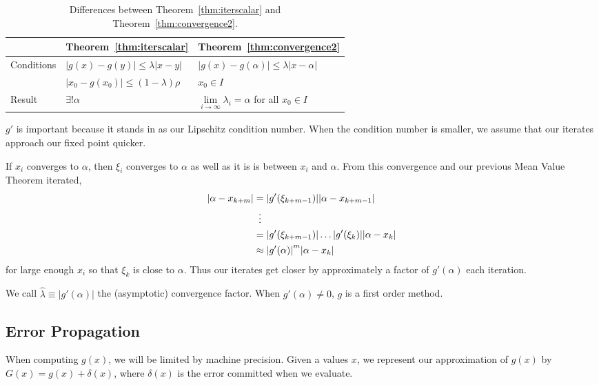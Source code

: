 \documentclass[12pt,letterpaper,DIV=11]{scrartcl}
\theoremstyle{plain}
\theoremstyle{definition}
\theoremstyle{remark}
\begin{document}
\begin{table}
  \centering
  \begin{tabular}{l l l}
    \toprule
  & Theorem~\ref{thm:iterscalar} & Theorem~\ref{thm:convergence2} \\
  \midrule
    \multirow{2}{*}{Conditions} & $|g(x) - g(y)| \leq \lambda |x - y|$ & $|g(x) - g(\alpha)| \leq \lambda |x - \alpha|$ \\
                                & $|x_0 - g(x_0)| \leq (1 - \lambda) \rho$ & $x_0 \in I$ \\
                                \midrule
    Result & $\exists! \alpha$ & $\lim\limits_{i \to \infty} \lambda_i = \alpha$ for all $x_0 \in I$ \\
    \bottomrule
  \end{tabular}
  \caption{Differences between Theorem~\ref{thm:iterscalar} and Theorem~\ref{thm:convergence2}.}
\end{table}

$g'$ is important because it stands in as our Lipschitz condition number.
When the condition number is smaller, we assume that our iterates approach our fixed point quicker.

If $x_i$ converges to $\alpha$, then $\xi_i$ converges to $\alpha$ as well as it is is between $x_i$ and $\alpha$.
From this convergence and our previous Mean Value Theorem iterated, \begin{align*}
  |\alpha - x_{k + m}| &= |g'(\xi_{k + m - 1})| |\alpha - x_{k + m - 1}| \\
                       &\vdotswithin{=} \\
                       &= |g'(\xi_{k + m - 1})| \dots |g'(\xi_k)| |\alpha - x_k| \\
                       &\approx {|g'(\alpha)|}^m |\alpha - x_k|
\end{align*} for large enough $x_i$ so that $\xi_k$ is close to $\alpha$.
Thus our iterates get closer by approximately a factor of $g'(\alpha)$ each iteration.

We call $\hat{\lambda} \equiv |g'(\alpha)|$ the (asymptotic) convergence factor.
When $g'(\alpha) \neq 0$, $g$ is a first order method.

\subsection{Error Propagation}
When computing $g(x)$, we will be limited by machine precision.
Given a values $x$, we represent our approximation of $g(x)$ by $G(x) = g(x) + \delta(x)$, where $\delta(x)$ is the error committed when we evaluate.
\end{document}
